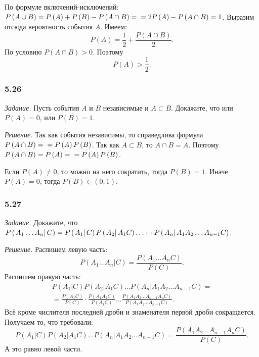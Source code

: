 По формуле включений-исключений:
$P \left( A \cup B \right) =
P \left( A \right) + P \left( B \right) - P \left( A \cap B \right) = \\
= 2P \left( A \right) - P \left( A \cap B \right) =
1$.
Выразим отсюда вероятность события $A$.
Имеем:
$$P \left( A \right) = \frac{1}{2} + \frac{P \left( A \cap B \right) }{2}.$$
По условию $P \left( A \cap B \right) > 0$.
Поэтому
$$P \left( A \right) >
\frac{1}{2}.$$

\subsubsection*{5.26}

\textit{Задание.} Пусть события $A$ и $B$ независимые и $A \subset B$.
Докажите, что или $P \left( A \right) = 0$, или $P \left( B \right) = 1$.

\textit{Решение.} Так как события независимы, то справедлива формула $P \left( A \cap B \right) =  \\ = P \left( A \right) P \left( B \right) $.
Так как $A \subset B$, то $A \cap B = A$.
Поэтому $P \left( A \cap B \right) = P \left( A \right) = \\ = P \left( A \right) P \left( B \right) $.

Если $P \left( A \right) \neq 0$, то можно на него сократить, тогда $P \left( B \right) = 1$.
Иначе $P \left( A \right) = 0$, тогда $P \left( B \right) \in \left( 0, 1 \right) $.

\subsubsection*{5.27}

\textit{Задание.} Докажите, что
$P \left( \left. A_1 \dotsc A_n \right| C \right) =
P \left( \left. A_1 \right| C \right)
P \left( \left. A_2 \right| A_1 C \right) \dotsc \cdot \\
\cdot P \left( \left. A_n \right| A_1 A_2 \dotsc A_{n-1} C \right) $.

\textit{Решение.} Распишем левую часть:
$$P \left( \left. A_1 \dotsc A_n \right| C \right) =
\frac{P \left( A_1 \dotsc A_n C \right) }{P \left( C \right) }.$$
Распишем правую часть:
\begin{equation*}
\begin{split}
P \left( \left. A_1 \right| C \right) P \left( \left. A_2 \right| A_1 C \right) \dotsc
P \left( \left. A_n \right| A_1 A_2 \dotsc A_{n-1} C \right) = \\
= \frac{P \left( A_1 C \right) }{P \left( C \right) } \cdot \frac{P \left( A_1 A_2 C \right) }{P \left( A_1 C \right) } \dotsc
\frac{P \left( A_1 A_2 \dotsc A_{n-1} A_n C \right) }{P \left( A_1 A_2 \dotsc A_{n-1} C \right) }.
\end{split}
\end{equation*}
Всё кроме числителя последней дроби и знаменателя первой дроби сокращается.
Получаем то, что требовали:
$$P \left( \left. A_1 \right| C \right) P \left( \left. A_2 \right| A_1 C \right) \dotsc
P \left( \left. A_n \right| A_1 A_2 \dotsc A_{n-1} C \right) =
\frac{P \left( A_1 A_2 \dotsc A_{n-1} A_n C \right) }{P \left( C \right) }.$$
А это равно левой части.

